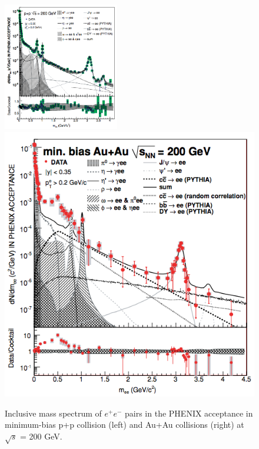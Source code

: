 \begin{figure}
\begin{centering}
\includegraphics[width=0.45\textwidth]{fig/1.Introduction/PHENIX_PP}\includegraphics[width=0.45\columnwidth]{fig/1.Introduction/PHENIX_AuAu}
\par\end{centering}

\protect\caption{Inclusive mass spectrum of $e^{+}e^{-}$ pairs in the PHENIX acceptance
in minimum-bias p+p collision (left) and Au+Au collisions (right)
at $\sqrt{s}$ = 200 GeV. \cite{PhysRevC.81.034911}}


\label{fig:PHENIX_fullmass}
\end{figure}



